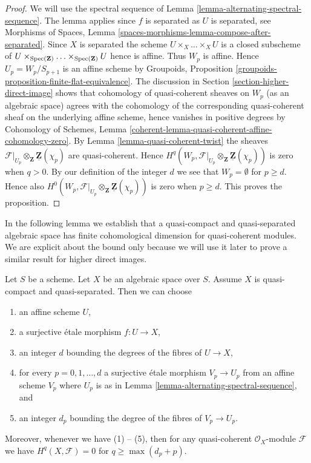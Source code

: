 \begin{proof}
We will use the spectral sequence of
Lemma \ref{lemma-alternating-spectral-sequence}.
The lemma applies since $f$ is separated as $U$ is separated, see
Morphisms of Spaces, Lemma
\ref{spaces-morphisms-lemma-compose-after-separated}.
Since $X$ is separated the scheme $U \times_X \ldots \times_X U$ is a closed
subscheme of
$U \times_{\mathop{\mathrm{Spec}}(\mathbf{Z})} \ldots \times_{\mathop{\mathrm{Spec}}(\mathbf{Z})} U$
hence is affine. Thus $W_p$ is affine. Hence $U_p = W_p/S_{p + 1}$ is an
affine scheme by
Groupoids, Proposition \ref{groupoids-proposition-finite-flat-equivalence}.
The discussion in
Section \ref{section-higher-direct-image}
shows that cohomology of quasi-coherent sheaves on $W_p$ (as an algebraic
space) agrees with the cohomology of the corresponding quasi-coherent
sheaf on the underlying affine scheme, hence vanishes in positive degrees by
Cohomology of Schemes, Lemma
\ref{coherent-lemma-quasi-coherent-affine-cohomology-zero}.
By
Lemma \ref{lemma-quasi-coherent-twist}
the sheaves
$\mathcal{F}|_{U_p} \otimes_\mathbf{Z} \underline{\mathbf{Z}}(\chi_p)$
are quasi-coherent. Hence
$H^q(W_p,
\mathcal{F}|_{U_p} \otimes_\mathbf{Z} \underline{\mathbf{Z}}(\chi_p))$
is zero when $q > 0$. By our definition of the integer $d$ we see that
$W_p = \emptyset$ for $p \geq d$. Hence also
$H^0(W_p,
\mathcal{F}|_{U_p} \otimes_\mathbf{Z} \underline{\mathbf{Z}}(\chi_p))$
is zero when $p \geq d$.
This proves the proposition.
\end{proof}

\noindent
In the following lemma we establish that a quasi-compact and
quasi-separated algebraic space has finite cohomological dimension
for quasi-coherent modules. We are explicit about the bound only because
we will use it later to prove a similar result for higher direct
images.

\begin{lemma}
\label{lemma-vanishing-quasi-separated}
Let $S$ be a scheme. Let $X$ be an algebraic space over $S$.
Assume $X$ is quasi-compact and quasi-separated.
Then we can choose
\begin{enumerate}
\item an affine scheme $U$,
\item a surjective \'etale morphism $f : U \to X$,
\item an integer $d$ bounding the degrees of the fibres of $U \to X$,
\item for every $p = 0, 1, \ldots, d$ a surjective \'etale morphism
$V_p \to U_p$ from an affine scheme $V_p$ where $U_p$ is as in
Lemma \ref{lemma-alternating-spectral-sequence}, and
\item an integer $d_p$ bounding the degree of the fibres of $V_p \to U_p$.
\end{enumerate}
Moreover, whenever we have (1) -- (5), then for any quasi-coherent
$\mathcal{O}_X$-module $\mathcal{F}$ we have $H^q(X, \mathcal{F}) = 0$ for
$q \geq \max(d_p + p)$.
\end{lemma}

